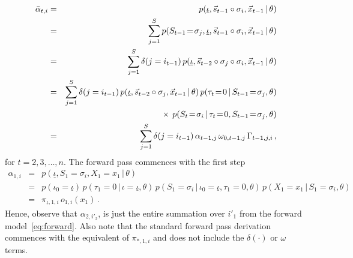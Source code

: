 \documentclass[a4paper]{article}
\begin{document}
\begin{eqnarray}
   \bar{\alpha}_{t,i} & = & p(\underline{\iota},\vec{s}_{t-1}\circ\sigma_{i},\vec{x}_{t-1}\,|\,\theta) 
\nonumber\\& = &
   \sum_{j=1}^{S}p(S_{t-1}\!=\!\sigma_j,\underline{\iota},\vec{s}_{t-1}\circ\sigma_{i},\vec{x}_{t-1}\,|\,\theta) 
\nonumber\\& = &
   \sum_{j=1}^{S}\delta(j=i_{t-1})\,p(\underline{\iota},\vec{s}_{t-2}\circ\sigma_{j}\circ\sigma_{i},\vec{x}_{t-1}\,|\,\theta) 
\nonumber\\& = &
   \sum_{j=1}^{S}\delta(j=i_{t-1})\,p(\underline{\iota},\vec{s}_{t-2}\circ\sigma_{j},\vec{x}_{t-1}\,|\,\theta) 
      \,p(\tau_t\!=\!0\,|\,S_{t-1}\!=\!\sigma_j,\theta)
\nonumber\\&&
    \hspace*{5mm}{}\times\,p(S_t\!=\!\sigma_i\,|\,\tau_{t}\!=\!0,S_{t-1}\!=\!\sigma_j,\theta)
\nonumber\\& = &
   \sum_{j=1}^{S}\delta(j=i_{t-1})\,\alpha_{t-1,j}\,\omega_{0,t-1,j}\,\Gamma_{t-1,j,i}\,,
\label{eq:alpha-bar}
\end{eqnarray}
for $t=2,3,\ldots,n$. The forward pass commences with the first step
\begin{eqnarray}
  \alpha_{1,i} & = & p(\underline{\iota},S_1=\sigma_{i},X_1\!=\!x_1\,|\,\theta) 
\nonumber\\& = & 
  p(\iota_0\!=\!\underline{\iota})\,p(\tau_1\!=\!0\,|\,\iota\!=\!\underline{\iota},\theta)
\,p(S_1\!=\!\sigma_i\,|\,\iota_0\!=\!\underline{\iota},\tau_1\!=\!0,\theta)\,p(X_1\!=\!x_1\,|\,S_1\!=\!\sigma_i,\theta)
\nonumber\\& = & 
  \pi_{\underline{\iota},1,i}\,o_{1,i}(x_1)
\,.
\end{eqnarray}
Hence, observe that $\alpha_{2,i'_2}$, is just
the entire summation over $i'_1$ from the forward model~\eqref{eq:forward}.
Also note that the standard forward pass derivation commences with the equivalent of $\pi_{*,1,i}$ and does not include the
$\delta(\cdot)$ or $\omega$ terms.
\end{document}
